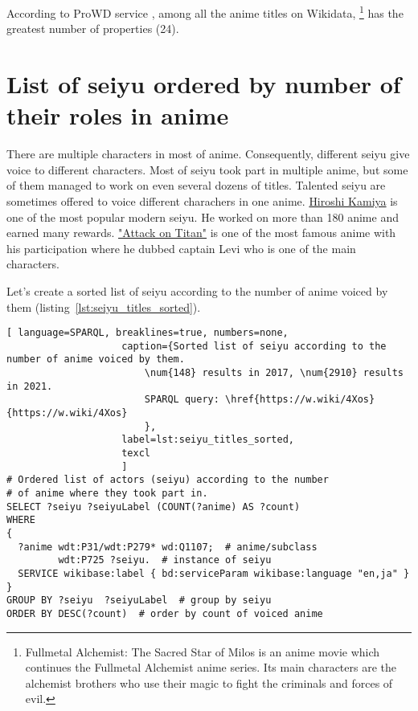 According to ProWD service \autocite{anime_prowd}, among all the anime titles on Wikidata, \footnote{Fullmetal Alchemist: The Sacred Star of Milos is an anime movie which continues the Fullmetal Alchemist anime series. Its main characters are the alchemist brothers who use their magic to fight the criminals and forces of evil.} has the greatest number of properties (\num{24}).

\section{List of seiyu ordered by number of their roles in anime}

There are multiple characters in most of anime. Consequently, different seiyu give voice to different characters. Most of seiyu took part in multiple anime, but some of them managed to work on even several dozens of titles. Talented seiyu are sometimes offered to voice different charachers in one anime. \href{https://w.wiki/4UFa}{Hiroshi Kamiya} is one of the most popular modern seiyu. He worked on more than 180 anime and earned many rewards. \href{https://w.wiki/4UFh}{"Attack on Titan"} is one of the most famous anime with his participation where he dubbed captain Levi who is one of the main characters.

Let's create a sorted list of seiyu according to the number of anime voiced by them (listing~\ref{lst:seiyu_titles_sorted}).

\begin{lstlisting}[ language=SPARQL, breaklines=true, numbers=none,
                    caption={Sorted list of seiyu according to the number of anime voiced by them.
                        \num{148} results in 2017, \num{2910} results in 2021.
                        SPARQL query: \href{https://w.wiki/4Xos}{https://w.wiki/4Xos}
                        },
                    label=lst:seiyu_titles_sorted,
                    texcl 
                    ]
# Ordered list of actors (seiyu) according to the number
# of anime where they took part in.
SELECT ?seiyu ?seiyuLabel (COUNT(?anime) AS ?count)
WHERE
{
  ?anime wdt:P31/wdt:P279* wd:Q1107;  # anime/subclass
         wdt:P725 ?seiyu.  # instance of seiyu
  SERVICE wikibase:label { bd:serviceParam wikibase:language "en,ja" }
}
GROUP BY ?seiyu  ?seiyuLabel  # group by seiyu 
ORDER BY DESC(?count)  # order by count of voiced anime
\end{lstlisting}%

